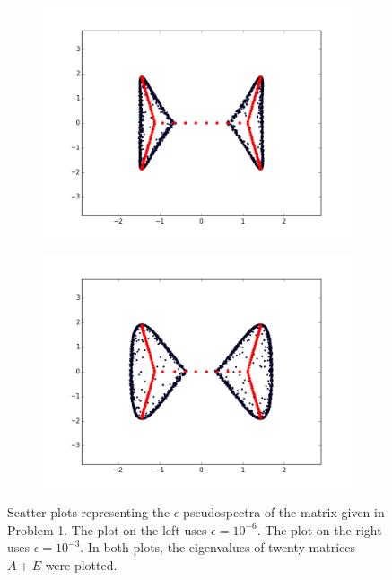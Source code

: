 \begin{figure}
\begin{center}
\begin{subfigure}[b]{.49\textwidth}
\centering
\includegraphics[width=\textwidth]{ps_scatter1}
\end{subfigure}
\begin{subfigure}[b]{.49\textwidth}
\centering
\includegraphics[width=\textwidth]{ps_scatter2}
\end{subfigure}
\caption{Scatter plots representing the $\epsilon$-pseudospectra of the matrix given in Problem 1. The plot on the left uses $\epsilon=10^{-6}$. The plot on the right uses $\epsilon=10^{-3}$. In both plots, the eigenvalues of twenty matrices $A+E$ were plotted.}
\label{fig:ps_scatter}
\end{center}
\end{figure}

